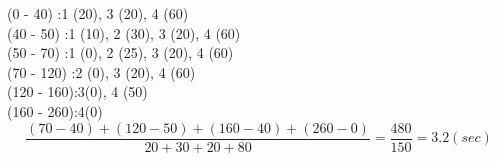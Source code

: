 \documentclass[12pt]{article}
\begin{document}
\begin{enumerate}
        (0 - 40)   \space\space:1 (20), 3 (20), 4 (60)\\
        (40 - 50)  \space:1 (10), 2 (30),  3 (20), 4 (60)\\
        (50 - 70)  \space:1 (0), 2 (25), 3 (20), 4 (60)\\ 
        (70 - 120) :2 (0), 3 (20), 4 (60)\\
        (120 - 160):3(0), 4 (50)\\
        (160 - 260):4(0)\\

        \begin{equation*}
        \frac{(70 - 40)+(120 - 50)+(160 - 40)+(260 - 0)}{20 + 30 + 20 +80} = \frac{480}{150} = 3.2 (sec)
        \end{equation*}

    \end{enumerate}
\end{document}
